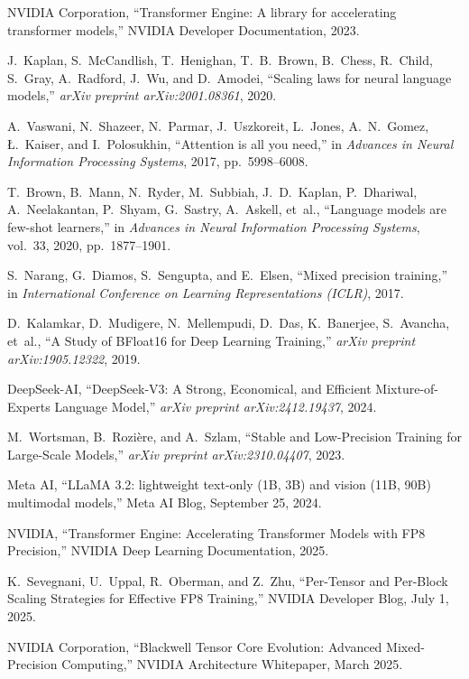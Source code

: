 \documentclass[conference]{IEEEtran}
\begin{document}
\begin{thebibliography}{30}
NVIDIA Corporation,
``Transformer Engine: A library for accelerating transformer models,''
NVIDIA Developer Documentation, 2023.

J.~Kaplan, S.~McCandlish, T.~Henighan, T.~B.~Brown, B.~Chess, R.~Child, S.~Gray, A.~Radford, J.~Wu, and D.~Amodei,
``Scaling laws for neural language models,''
\emph{arXiv preprint arXiv:2001.08361}, 2020.

A.~Vaswani, N.~Shazeer, N.~Parmar, J.~Uszkoreit, L.~Jones, A.~N.~Gomez, {\L}.~Kaiser, and I.~Polosukhin,
``Attention is all you need,''
in \emph{Advances in Neural Information Processing Systems}, 2017, pp.~5998--6008.

T.~Brown, B.~Mann, N.~Ryder, M.~Subbiah, J.~D.~Kaplan, P.~Dhariwal, A.~Neelakantan, P.~Shyam, G.~Sastry, A.~Askell, et~al.,
``Language models are few-shot learners,''
in \emph{Advances in Neural Information Processing Systems}, vol.~33, 2020, pp.~1877--1901.

S.~Narang, G.~Diamos, S.~Sengupta, and E.~Elsen,
``Mixed precision training,''
in \emph{International Conference on Learning Representations (ICLR)}, 2017.

D.~Kalamkar, D.~Mudigere, N.~Mellempudi, D.~Das, K.~Banerjee, S.~Avancha, et~al.,
``A Study of BFloat16 for Deep Learning Training,''
\emph{arXiv preprint arXiv:1905.12322}, 2019.

DeepSeek-AI,
``DeepSeek-V3: A Strong, Economical, and Efficient Mixture-of-Experts Language Model,''
\emph{arXiv preprint arXiv:2412.19437}, 2024.

M.~Wortsman, B.~Rozière, and A.~Szlam,
``Stable and Low-Precision Training for Large-Scale Models,''
\emph{arXiv preprint arXiv:2310.04407}, 2023.

Meta AI, 
``LLaMA 3.2: lightweight text-only (1B, 3B) and vision (11B, 90B) multimodal models,'' 
Meta AI Blog, September 25, 2024.

NVIDIA,
``Transformer Engine: Accelerating Transformer Models with FP8 Precision,''
NVIDIA Deep Learning Documentation, 2025.

K.~Sevegnani, U.~Uppal, R.~Oberman, and Z.~Zhu,
``Per-Tensor and Per-Block Scaling Strategies for Effective FP8 Training,''
NVIDIA Developer Blog, July 1, 2025.

NVIDIA Corporation,
``Blackwell Tensor Core Evolution: Advanced Mixed-Precision Computing,''
NVIDIA Architecture Whitepaper, March 2025.

\end{thebibliography}
\end{document}

